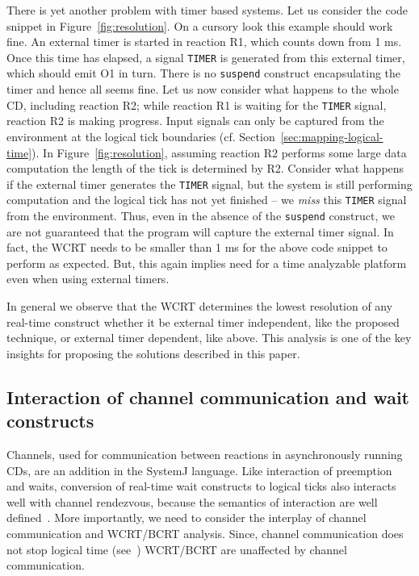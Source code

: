 There is yet another problem with timer based systems. Let us consider
the code snippet in Figure~\ref{fig:resolution}. On a cursory look this
example should work fine. An external timer is started in reaction R1,
which counts down from 1 ms. Once this time has elapsed, a signal
\texttt{TIMER} is generated from this external timer, which should emit
O1 in turn. There is no \texttt{suspend} construct encapsulating the
timer and hence all seems fine. Let us now consider what happens to the
whole CD, including reaction R2; while reaction R1 is waiting for the
\texttt{TIMER} signal, reaction R2 is making progress. Input signals can
only be captured from the environment at the logical tick boundaries
(cf. Section~\ref{sec:mapping-logical-time}). In
Figure~\ref{fig:resolution}, assuming reaction R2 performs some large
data computation the length of the tick is determined by R2. Consider
what happens if the external timer generates the \texttt{TIMER} signal,
but the system is still performing computation and the logical tick has
not yet finished -- we \textit{miss} this \texttt{TIMER} signal from the
environment. Thus, even in the absence of the \texttt{suspend}
construct, we are not guaranteed that the program will capture the
external timer signal. In fact, the WCRT needs to be smaller than 1 ms
for the above code snippet to perform as expected. But, this again
implies need for a time analyzable platform even when using external
timers.

In general we observe that the WCRT determines the lowest resolution of
any real-time construct whether it be external timer independent, like
the proposed technique, or external timer dependent, like above. This
analysis is one of the key insights for proposing the solutions
described in this paper.


\subsection{Interaction of channel communication and wait constructs}
\label{sec:inter-chann-comm}

Channels, used for communication between reactions in asynchronously
running CDs, are an addition in the SystemJ language. Like interaction
of preemption and waits, conversion of real-time wait constructs to
logical ticks also interacts well with channel rendezvous, because the
semantics of interaction are well defined~\cite{amal10}. More
importantly, we need to consider the interplay of channel communication
and WCRT/BCRT analysis. Since, channel communication does not stop
logical time (see~\cite{amal10}) WCRT/BCRT are unaffected by channel
communication. %

